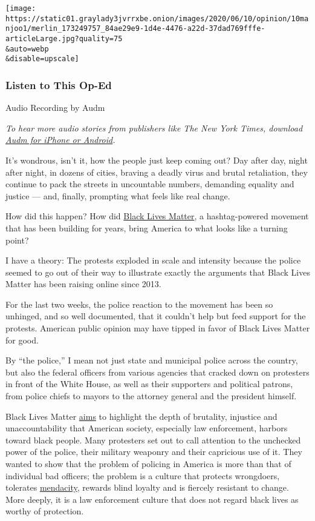 \texttt{[image: https://static01.graylady3jvrrxbe.onion/images/2020/06/10/opinion/10manjoo1/merlin\_173249757\_84ae29e9-1d4e-4476-a22d-37dad769fffe-articleLarge.jpg?quality=75\\\&auto=webp\\\&disable=upscale]}

\hypertarget{listen-to-this-op-ed}{%
\subsubsection{Listen to This Op-Ed}\label{listen-to-this-op-ed}}

Audio Recording by Audm

\emph{To hear more audio stories from publishers like The New York
Times, download}
\href{https://www.audm.com/?utm_source=nytopinion\&utm_medium=embed\&utm_campaign=black_lives_winning}{\emph{Audm
for iPhone or Android}}\emph{.}

It's wondrous, isn't it, how the people just keep coming out? Day after
day, night after night, in dozens of cities, braving a deadly virus and
brutal retaliation, they continue to pack the streets in uncountable
numbers, demanding equality and justice --- and, finally, prompting what
feels like real change.

How did this happen? How did
\href{https://www.nytimes3xbfgragh.onion/interactive/2020/06/10/upshot/black-lives-matter-attitudes.html}{Black
Lives Matter}, a hashtag-powered movement that has been building for
years, bring America to what looks like a turning point?

I have a theory: The protests exploded in scale and intensity because
the police seemed to go out of their way to illustrate exactly the
arguments that Black Lives Matter has been raising online since 2013.

For the last two weeks, the police reaction to the movement has been so
unhinged, and so well documented, that it couldn't help but feed support
for the protests. American public opinion may have tipped in favor of
Black Lives Matter for good.

By ``the police,'' I mean not just state and municipal police across the
country, but also the federal officers from various agencies that
cracked down on protesters in front of the White House, as well as their
supporters and political patrons, from police chiefs to mayors to the
attorney general and the president himself.

Black Lives Matter \href{https://blacklivesmatter.com/about/}{aims} to
highlight the depth of brutality, injustice and unaccountability that
American society, especially law enforcement, harbors toward black
people. Many protesters set out to call attention to the unchecked power
of the police, their military weaponry and their capricious use of it.
They wanted to show that the problem of policing in America is more than
that of individual bad officers; the problem is a culture that protects
wrongdoers, tolerates
\href{https://apnews.com/a172fb01bdb74b4159b39da390d9e79e}{mendacity},
rewards blind loyalty and is fiercely resistant to change. More deeply,
it is a law enforcement culture that does not regard black lives as
worthy of protection.

